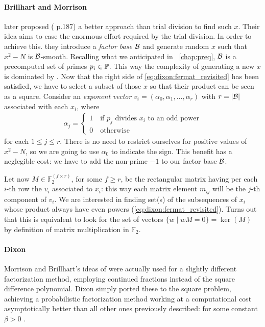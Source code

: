\paragraph{Brillhart and Morrison} later proposed (\cite{morrison-brillhart}
p.187) a better approach than trial division to find such $x$. Their idea aims
to ease the enormous effort required by the trial division. In order to achieve
this. they introduce a \emph{factor base} $\mathcal{B}$ and generate random $x$
such that $x^2 - N$ is $\mathcal{B}$-smooth. Recalling what we anticipated in
~\ref{chap:preq}, $\mathcal{B}$ is a precomputed set of primes
$p_i \in \mathbb{P}$.
This way the complexity of generating a new $x$ is dominated by
\bigO{|\factorBase|}. Now that the right side of \ref{eq:dixon:fermat_revisited}
has been satisfied, we have to select a subset of those $x$ so that their
product can be seen as a square. Consider an \emph{exponent vector}
$v_i = (\alpha_0, \alpha_1, \ldots, \alpha_r)$ with $r = |\mathcal{B}|$
associated with each $x_i$, where
\begin{align}
  \label{eq:dixon:alphas}
  \alpha_j = \begin{cases}
    1 \quad \text{if $p_j$ divides $x_i$ to an odd power} \\
    0 \quad \text{otherwise}
  \end{cases}
\end{align}
for each $1 \leq j \leq r $. There is no need to restrict ourselves for positive
values of $x^2 -N$, so we are going to use $\alpha_0$ to indicate the sign. This
benefit has a neglegible cost: we have to add the non-prime $-1$ to our factor
base $\mathcal{B}$.

Let now $M \in \mathbb{F}_2^{(f \times r)}$,
for some $f \geq r$,
be the rectangular matrix having per each $i$-th row the
$v_i$ associated to $x_i$: this way each matrix element $m_{ij}$ will be the
$j$-th component of $v_i$.
We are interested in finding set(s) of the subsequences of $x_i$
whose product always have even powers (\ref{eq:dixon:fermat_revisited}).
Turns out that this is equivalent to look for the set of vectors
$\{ w \mid wM = 0 \} = \ker(M)$ by definition of matrix multiplication
in $\mathbb{F}_2$.


\paragraph{Dixon} Morrison and Brillhart's ideas of \cite{morrison-brillhart}
were actually used for a slightly different factorization method, employing
continued fractions instead of the square difference polynomial. Dixon simply
ported these to the square problem, achieving a probabilistic factorization
method working at a computational cost asymptotically better than all other ones
previously described: 
for some constant $\beta > 0$ \cite{dixon}.

